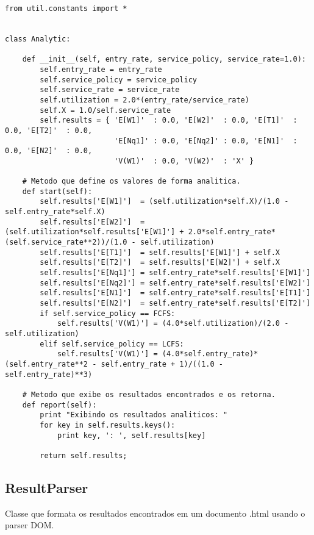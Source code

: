 \begin{lstlisting}
from util.constants import *


class Analytic:

    def __init__(self, entry_rate, service_policy, service_rate=1.0):
        self.entry_rate = entry_rate
        self.service_policy = service_policy
        self.service_rate = service_rate
        self.utilization = 2.0*(entry_rate/service_rate)
        self.X = 1.0/self.service_rate
        self.results = { 'E[W1]'  : 0.0, 'E[W2]'  : 0.0, 'E[T1]'  : 0.0, 'E[T2]'  : 0.0,
                         'E[Nq1]' : 0.0, 'E[Nq2]' : 0.0, 'E[N1]'  : 0.0, 'E[N2]'  : 0.0,
                         'V(W1)'  : 0.0, 'V(W2)'  : 'X' }
    
    # Metodo que define os valores de forma analitica.
    def start(self):
        self.results['E[W1]']  = (self.utilization*self.X)/(1.0 - self.entry_rate*self.X)
        self.results['E[W2]']  = (self.utilization*self.results['E[W1]'] + 2.0*self.entry_rate*(self.service_rate**2))/(1.0 - self.utilization)
        self.results['E[T1]']  = self.results['E[W1]'] + self.X
        self.results['E[T2]']  = self.results['E[W2]'] + self.X
        self.results['E[Nq1]'] = self.entry_rate*self.results['E[W1]']
        self.results['E[Nq2]'] = self.entry_rate*self.results['E[W2]']
        self.results['E[N1]']  = self.entry_rate*self.results['E[T1]']
        self.results['E[N2]']  = self.entry_rate*self.results['E[T2]']
        if self.service_policy == FCFS:
            self.results['V(W1)'] = (4.0*self.utilization)/(2.0 - self.utilization)
        elif self.service_policy == LCFS:
            self.results['V(W1)'] = (4.0*self.entry_rate)*(self.entry_rate**2 - self.entry_rate + 1)/((1.0 - self.entry_rate)**3)
    
    # Metodo que exibe os resultados encontrados e os retorna.
    def report(self):
        print "Exibindo os resultados analiticos: "
        for key in self.results.keys():
            print key, ': ', self.results[key]
        
        return self.results;
\end{lstlisting}

\subsection{ResultParser}
Classe que formata os resultados encontrados em um documento .html usando o parser DOM.\\

